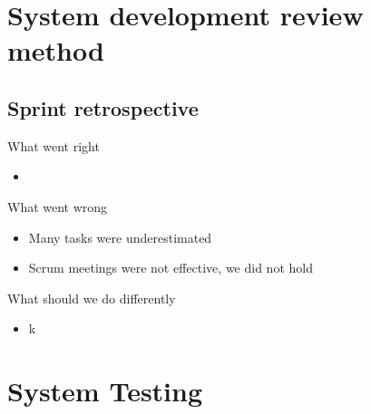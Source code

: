 \documentclass[12pt]{article}
\begin{document}
\section{System development review method} 
\subsection{Sprint retrospective}
What went right 
\begin{itemize}
\item 


\end{itemize}
What went wrong

\begin{itemize}
\item Many tasks were underestimated
\item Scrum meetings were not effective, we did not hold  

\end{itemize}
What should we do differently
\begin{itemize}
\item k
\end{itemize}













\section{System Testing}
\end{document}
